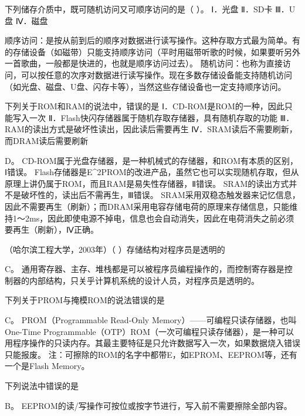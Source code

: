 \question 下列储存介质中，既可随机访问又可顺序访问的是（ ）。 Ⅰ．光盘 Ⅱ．SD卡
Ⅲ．U盘 Ⅳ．磁盘
\par{}
\begin{solution}顺序访问：是按从前到后的顺序对数据进行读写操作。这种存取方式最为简单。有的存储设备（如磁带）只能支持顺序访问（平时用磁带听歌的时候，如果要听另外一首歌曲，一般都是快进的，也就是顺序访问过去）。
随机访问：也称为直接访问，可以按任意的次序对数据进行读写操作。现在多数存储设备能支持随机访问（如光盘、磁盘、U盘、闪存卡等），当然这些存储设备也一定支持顺序访问。
\end{solution}
\question 下列关于ROM和RAM的说法中，错误的是
Ⅰ．CD-ROM是ROM的一种，因此只能写入一次
Ⅱ．Flash快闪存储器属于随机存取存储器，具有随机存取的功能
Ⅲ．RAM的读出方式是破坏性读出，因此读后需要再生
Ⅳ．SRAM读后不需要刷新，而DRAM读后需要刷新
\par{}
\begin{solution}D。
CD-ROM属于光盘存储器，是一种机械式的存储器，和ROM有本质的区别，Ⅰ错误。
Flash存储器是E\^{}2PROM的改进产品，虽然它也可以实现随机存取，但从原理上讲仍属于ROM，而且RAM是易失性存储器，Ⅱ错误。
SRAM的读出方式并不是破坏性的，读出后不需再生，Ⅲ错误。
SRAM采用双稳态触发器来记忆信息，因此不需要再生（刷新）；而DRAM采用电容存储电荷的原理来存储信息，只能维持1～2ms，因此即使电源不掉电，信息也会自动消失，因此在电荷消失之前必须要再生（刷新），Ⅳ正确。
\end{solution}
\question （哈尔滨工程大学，2003年）（ ）存储结构对程序员是透明的
\par{}
\begin{solution}C。
通用寄存器、主存、堆栈都是可以被程序员编程操作的，而控制寄存器是控制器的内部结构，只关乎计算机系统的设计人员，对程序员是透明的。
\end{solution}
\question 下列关于PROM与掩模ROM的说法错误的是
\par{}
\begin{solution}C。 PROM（Programmable Read-Only
Memory）------可编程只读存储器，也叫One-Time
Programmable（OTP）ROM（一次可编程只读存储器），是一种可以用程序操作的只读内存。其最主要特征是只允许数据写入一次，如果数据烧入错误只能报废。
注：可擦除的ROM的名字中都带E，如EPROM、EEPROM等，还有一个是Flash
Memory。
\end{solution}
\question 下列说法中错误的是
\par{}
\begin{solution}B。 EEPROM的读/写操作可按位或按字节进行，写入前不需要擦除全部内容。
\end{solution}
